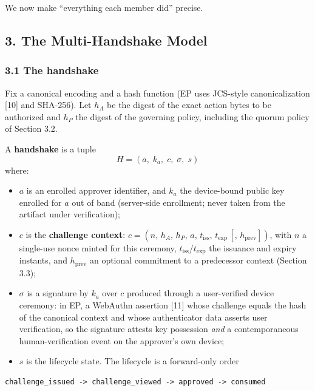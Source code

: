 \documentclass[
  11pt,
]{article}
\providecommand{\tightlist}{%
  \setlength{\itemsep}{0pt}\setlength{\parskip}{0pt}}
\begin{document}
We now make ``everything each member did'' precise.

\subsection{3. The Multi-Handshake
Model}\label{the-multi-handshake-model}

\subsubsection{3.1 The handshake}\label{the-handshake}

Fix a canonical encoding and a hash function (EP uses JCS-style
canonicalization {[}10{]} and SHA-256). Let $h_A$ be the digest of the
exact action bytes to be authorized and $h_P$ the digest of the
governing policy, including the quorum policy of Section 3.2.

A \textbf{handshake} is a tuple
\[
H = (a,\; k_a,\; c,\; \sigma,\; s)
\]
where:

\begin{itemize}
\tightlist
\item
  $a$ is an enrolled approver identifier, and $k_a$ the device-bound
  public key enrolled for $a$ out of band (server-side enrollment; never
  taken from the artifact under verification);
\item
  $c$ is the \textbf{challenge context}:
  $c = (n,\, h_A,\, h_P,\, a,\, t_{\mathrm{iss}},\, t_{\mathrm{exp}}\, [,\, h_{\mathrm{prev}}])$,
  with $n$ a single-use nonce minted for this ceremony,
  $t_{\mathrm{iss}}$/$t_{\mathrm{exp}}$ the issuance and expiry
  instants, and $h_{\mathrm{prev}}$ an optional commitment to a
  predecessor context (Section 3.3);
\item
  $\sigma$ is a signature by $k_a$ over $c$ produced through a
  user-verified device ceremony: in EP, a WebAuthn assertion {[}11{]}
  whose challenge equals the hash of the canonical context and whose
  authenticator data asserts user verification, so the signature attests
  key possession \emph{and} a contemporaneous human-verification event
  on the approver's own device;
\item
  $s$ is the lifecycle state. The lifecycle is a forward-only order
\end{itemize}

\begin{verbatim}
challenge_issued -> challenge_viewed -> approved -> consumed
\end{verbatim}
\end{document}
